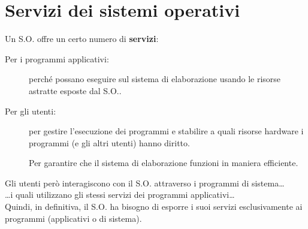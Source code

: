 \section{Servizi dei sistemi operativi}
Un S.O. offre un certo numero di \textbf{servizi}:
\begin{description}
    \item[Per i programmi applicativi:] perché possano eseguire sul sistema di elaborazione usando le risorse astratte esposte dal S.O..
    \item[Per gli utenti:] per gestire l'esecuzione dei programmi e stabilire a quali risorse hardware i programmi (e gli altri utenti) hanno diritto.
    \item[] Per garantire che il sistema di elaborazione funzioni in maniera efficiente.    
\end{description}
Gli utenti però interagiscono con il S.O. attraverso i programmi di sistema\dots\\
\dots i quali utilizzano gli stessi servizi dei programmi applicativi\dots\\
Quindi, in definitiva, il S.O. ha bisogno di esporre i suoi servizi esclusivamente ai programmi (applicativi o di sistema).


